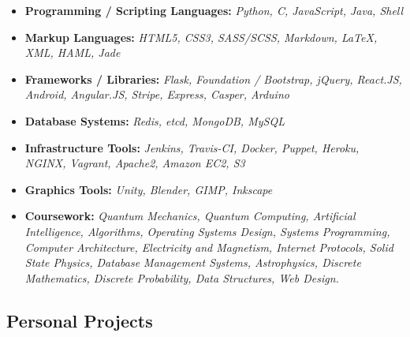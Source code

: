 \documentclass[12pt,a4paper,sans]{moderncv}
\begin{document}
\begin{itemize}

\item{\textbf{Programming / Scripting Languages:} \textit{Python, C, JavaScript, Java, Shell}}
\vspace{3pt}

\item{\textbf{Markup Languages:}\textit{ HTML5, CSS3, SASS/SCSS, Markdown, LaTeX, XML, HAML, Jade }}
\vspace{3pt}

\item{\textbf{Frameworks / Libraries:}\textit{ Flask, Foundation / Bootstrap, jQuery, React.JS, Android, Angular.JS, Stripe, Express, Casper, Arduino}}
\vspace{3pt}

\item{\textbf{Database Systems:}\textit{ Redis, etcd, MongoDB, MySQL}}
\vspace{3pt}

\item{\textbf{Infrastructure Tools:}\textit{ Jenkins, Travis-CI, Docker, Puppet, Heroku, NGINX, Vagrant, Apache2, Amazon EC2, S3}}
\vspace{3pt}

\item{\textbf{Graphics Tools:}\textit{ Unity, Blender, GIMP, Inkscape}}
\vspace{3pt}

\item{\textbf{Coursework:}
\textit{ Quantum Mechanics, Quantum Computing, Artificial Intelligence, Algorithms, Operating Systems Design, Systems Programming, Computer Architecture, Electricity and Magnetism, Internet Protocols, Solid State Physics, Database Management Systems, Astrophysics, Discrete Mathematics, Discrete Probability, Data Structures, Web Design.
}}

\end{itemize}


\subsection{Personal Projects}
\vspace{5pt}
\end{document}
